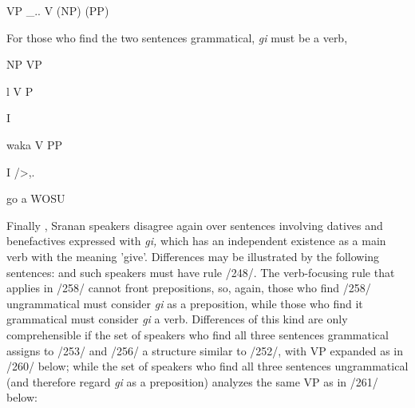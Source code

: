 \ea\label{ex:252}
\z

\ea\label{ex:259}
 VP \_.. V (NP) (PP)
\glt
\z


For those who find the two sentences grammatical,
\textit{gi} must be a verb,

\ea
NP VP

l V P

I

waka V PP

I /{\textquotedbl}{\textgreater},.

go a WOSU
\z

Finally , Sranan speakers disagree again over sentences involving datives and benefactives expressed with \textit{gi,} which has an independent existence as a main verb with the meaning 'give'. Differences may be illustrated by the following sentences:
and such speakers must have rule /248/. The verb-focusing rule that applies in /258/ cannot front prepositions, so, again, those who find /258/ 
 ungrammatical must consider \textit{gi} as a preposition, while those who find it grammatical must consider \textit{gi} a verb. Differences of this kind are only comprehensible if the set of speakers who find all three sentences grammatical assigns to /253/ and /256/ a structure similar to
/252/, with VP expanded as in /260/ below; while the set of speakers who find all three sentences ungrammatical (and therefore regard \textit{gi} as a preposition) analyzes the same VP as in /261/ below:


